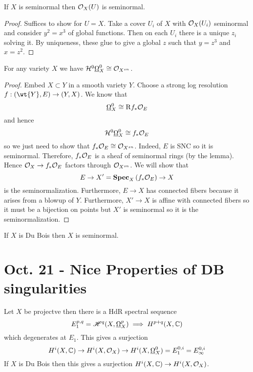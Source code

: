\documentclass[12pt]{article}
\newcommand{\R}{\mathrm{R}}
\renewcommand{\cH}{\mathcal{H}}
\begin{document}
\begin{lemma}
If $X$ is seminormal then $\mathcal{O}_{X}(U)$ is seminormal.
\end{lemma}

\begin{proof}
Suffices to show for $U = X$. Take a cover $U_i$ of $X$ with $\mathcal{O}_{X}(U_i)$ seminormal and consider $y^2 = x^3$ of global functions. Then on each $U_i$ there is a unique $z_i$ solving it. By uniqueness, these glue to give a global $z$ such that $y = z^3$ and $x = z^2$. 
\end{proof}

\begin{prop}
For any variety $X$ we have $\cH^0 \ul{\Omega}_X^0 \cong \struct{X^{sn}}$. 
\end{prop}

\begin{proof}
Embed $X \subset Y$ in a smooth variety $Y$. Choose a strong log resolution $f : (\wt{Y}, E) \to (Y, X)$. We know that
\[ \ul{\Omega}_X^0 \cong \R f_* \struct{E} \]
and hence
\[ \cH^0 \ul{\Omega}_X^0 \cong f_* \struct{E} \]
so we just need to show that $f_* \mathcal{O}_{E} \cong \mathcal{O}_{X^{sn}}$. Indeed, $E$ is SNC so it is seminormal. Therefore, $f_* \mathcal{O}_{E}$ is a sheaf of seminormal rings (by the lemma). Hence $\mathcal{O}_{X} \to f_* \mathcal{O}_{E}$ factors through $\mathcal{O}_{X^{sn}}$. We will show that
\[ E \to X' = \mathbf{Spec}_{X}\left( f_* \mathcal{O}_{E} \right) \to X \]
is the seminormalization. Furthermore, $E \to X$ has connected fibers because it arises from a blowup of $Y$. Furthermore, $X' \to X$ is affine with connected fibers so it must be a bijection on points but $X'$ is seminormal so it is the seminormalization. 
\end{proof}

\begin{cor}
If $X$ is Du Bois then $X$ is seminormal. 
\end{cor}

\section{Oct. 21 - Nice Properties of DB singularities}

Let $X$ be projectve then there is a HdR spectral sequence
\[ E^{p,q}_1 = \mathscr{H}^q(X, \underline{\Omega}_X^p) \implies H^{p+q}(X, \mathbb{C}) \]
which degenerates at $E_1$. This gives a surjection
\[ H^i(X, \mathbb{C}) \to H^i(X, \mathcal{O}_{X}) \to H^i(X, \underline{\Omega}_X^0) = E^{0,i}_1 = E^{0,i}_\infty \]
If $X$ is Du Bois then this gives a surjection $H^i(X, \mathbb{C}) \to H^i(X, \mathcal{O}_{X})$. 
\end{document}
